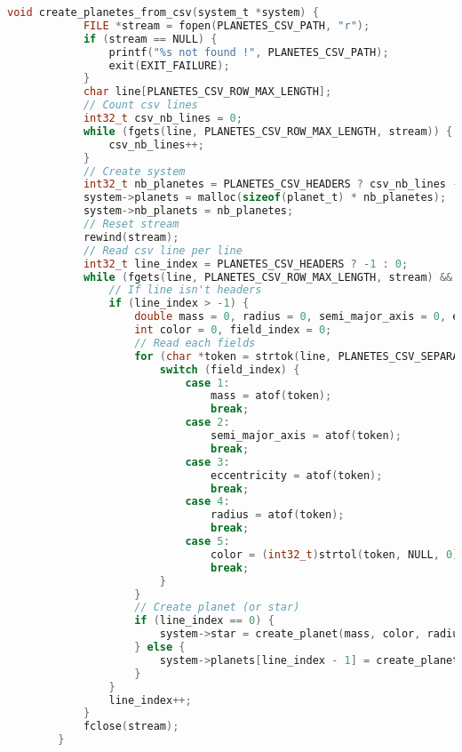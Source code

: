 \documentclass[a4paper,10pt]{article}
\begin{document}
    \begin{lstlisting}[language=c,label={lst:lstlisting7}]
        void create_planetes_from_csv(system_t *system) {
            FILE *stream = fopen(PLANETES_CSV_PATH, "r");
            if (stream == NULL) {
                printf("%s not found !", PLANETES_CSV_PATH);
                exit(EXIT_FAILURE);
            }
            char line[PLANETES_CSV_ROW_MAX_LENGTH];
            // Count csv lines
            int32_t csv_nb_lines = 0;
            while (fgets(line, PLANETES_CSV_ROW_MAX_LENGTH, stream)) {
                csv_nb_lines++;
            }
            // Create system
            int32_t nb_planetes = PLANETES_CSV_HEADERS ? csv_nb_lines - 2 : csv_nb_lines - 1;
            system->planets = malloc(sizeof(planet_t) * nb_planetes);
            system->nb_planets = nb_planetes;
            // Reset stream
            rewind(stream);
            // Read csv line per line
            int32_t line_index = PLANETES_CSV_HEADERS ? -1 : 0;
            while (fgets(line, PLANETES_CSV_ROW_MAX_LENGTH, stream) && line_index - 1 < nb_planetes) {
                // If line isn't headers
                if (line_index > -1) {
                    double mass = 0, radius = 0, semi_major_axis = 0, eccentricity = 0;
                    int color = 0, field_index = 0;
                    // Read each fields
                    for (char *token = strtok(line, PLANETES_CSV_SEPARATOR); token != NULL; token = strtok(NULL, PLANETES_CSV_SEPARATOR), field_index++) {
                        switch (field_index) {
                            case 1:
                                mass = atof(token);
                                break;
                            case 2:
                                semi_major_axis = atof(token);
                                break;
                            case 3:
                                eccentricity = atof(token);
                                break;
                            case 4:
                                radius = atof(token);
                                break;
                            case 5:
                                color = (int32_t)strtol(token, NULL, 0);
                                break;
                        }
                    }
                    // Create planet (or star)
                    if (line_index == 0) {
                        system->star = create_planet(mass, color, radius, semi_major_axis, eccentricity, true);
                    } else {
                        system->planets[line_index - 1] = create_planet(mass, color, radius, semi_major_axis, eccentricity, false);
                    }
                }
                line_index++;
            }
            fclose(stream);
        }
    \end{lstlisting}
\end{document}
